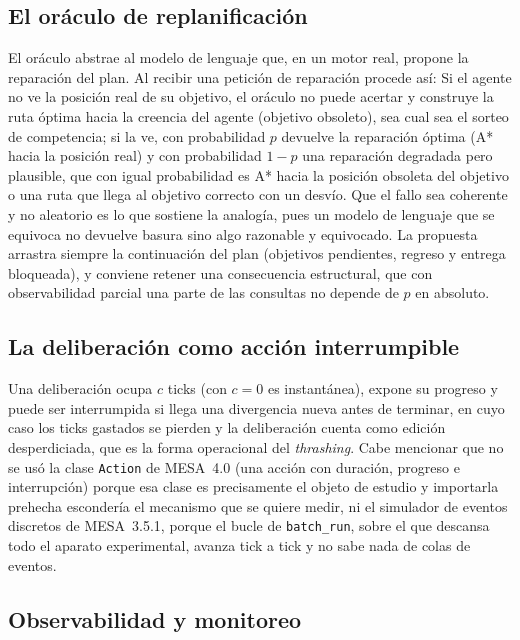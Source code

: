 \subsection{El oráculo de replanificación}

El oráculo abstrae al modelo de lenguaje que, en un motor real, propone la reparación del plan. Al recibir una petición de reparación procede así: Si el agente no ve la posición real de su objetivo, el oráculo no puede acertar y construye la ruta óptima hacia la creencia del agente (objetivo obsoleto), sea cual sea el sorteo de competencia; si la ve, con probabilidad $p$ devuelve la reparación óptima (A* hacia la posición real) y con probabilidad $1-p$ una reparación degradada pero plausible, que con igual probabilidad es A* hacia la posición obsoleta del objetivo o una ruta que llega al objetivo correcto con un desvío. Que el fallo sea coherente y no aleatorio es lo que sostiene la analogía, pues un modelo de lenguaje que se equivoca no devuelve basura sino algo razonable y equivocado. La propuesta arrastra siempre la continuación del plan (objetivos pendientes, regreso y entrega bloqueada), y conviene retener una consecuencia estructural, que con observabilidad parcial una parte de las consultas no depende de $p$ en absoluto.

\subsection{La deliberación como acción interrumpible}

Una deliberación ocupa $c$ ticks (con $c=0$ es instantánea), expone su progreso y puede ser interrumpida si llega una divergencia nueva antes de terminar, en cuyo caso los ticks gastados se pierden y la deliberación cuenta como edición desperdiciada, que es la forma operacional del \emph{thrashing}. Cabe mencionar que no se usó la clase \texttt{Action} de MESA~4.0 (una acción con duración, progreso e interrupción) porque esa clase es precisamente el objeto de estudio y importarla prehecha escondería el mecanismo que se quiere medir, ni el simulador de eventos discretos de MESA~3.5.1, porque el bucle de \texttt{batch\_run}, sobre el que descansa todo el aparato experimental, avanza tick a tick y no sabe nada de colas de eventos.

\subsection{Observabilidad y monitoreo}

